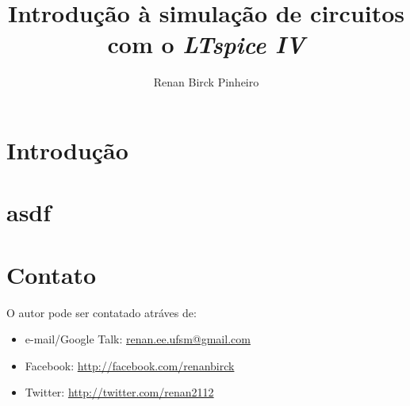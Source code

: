 \documentclass[]{report}
\title{\textbf{Introdução à simulação de circuitos com o \textit{LTspice IV}}}
\author{Renan Birck Pinheiro}
\begin{document}


\chapter{Introdução}
\chapter{asdf}

\chapter{Contato}
O autor pode ser contatado atráves de:

\begin{itemize}
\item e-mail/Google Talk: \url{renan.ee.ufsm@gmail.com}
\item Facebook: \url{http://facebook.com/renanbirck}
\item Twitter: \url{http://twitter.com/renan2112}
\end{itemize}
\end{document}
